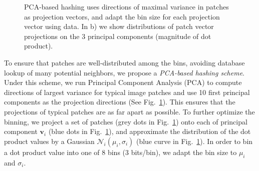 \begin{figure}[ht!]
\centering
{}
\qquad
{}
\caption{PCA-based hashing uses directions of maximal
variance in patches as projection vectors, and
adapt the bin size for each projection vector using data.
In b) we show distributions of patch vector projections
on the 3 principal components (magnitude of dot product).}
\label{fig:pca}
\end{figure}

To ensure that patches are well-distributed
among the bins, avoiding database lookup of many potential
neighbors, we propose a \emph{PCA-based hashing scheme}.
Under this scheme, we run Principal Component Analysis (PCA)
to compute directions of largest variance for typical image patches
and use 10 first principal components as the projection
directions (See Fig.~\ref{fig:pca}). This ensures that
the projections of typical patches are as far apart as possible.
To further optimize the binning, we project
a set of patches (grey dots in Fig.~\ref{fig:pca}) onto each
of principal component $\mathbf{v}_i$ (blue dots in Fig.~\ref{fig:pca}), and
approximate the distribution of the dot product
values by a Gaussian $\mathcal{N}_i(\mu_i, \sigma_i)$
(blue curve in Fig.~\ref{fig:pca}).
In order to bin a dot product value into one of 8 bins (3 bits/bin),
we adapt the bin size to $\mu_i$ and $\sigma_i$.

